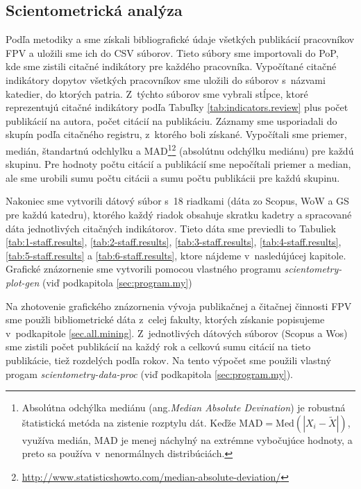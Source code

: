\subsection{Scientometrická analýza}

Podľa metodiky \citet{Kazakis2014a} a \citet{Kazakis2014b,Kazakis2015} sme
získali bibliografické údaje všetkých publikácií pracovníkov FPV a uložili sme
ich do CSV súborov. Tieto súbory sme importovali do PoP, kde sme zistili
citačné indikátory pre každého pracovníka. Vypočítané citačné indikátory
dopytov všetkých pracovníkov sme uložili do súborov s~názvami katedier, do
ktorých patria. Z~týchto súborov sme vybrali stĺpce, ktoré reprezentujú citačné
indikátory podľa Tabuľky \ref{tab:indicators.review} plus počet publikácií na
autora, počet citácií na publikáciu.  Záznamy sme usporiadali do skupín podľa
citačného registru, z~ktorého boli získané.  Vypočítali sme priemer, medián,
štandartnú odchlylku a MAD\footnote{Absolútna odchýlka mediánu
(ang.\emph{Median Absolute Devination}) je robustná štatistická metóda na
zistenie rozptylu dát. Keďže $\mathrm{MAD} = \mathrm{Med}(|X_i - \tilde{X}|)$,
využíva medián, MAD je menej náchylný na extrémne vybočujúce hodnoty, a preto
sa používa v~nenormálnych
distribúciách.}\footnote{\url{http://www.statisticshowto.com/median-absolute-deviation/}}
(absolútnu odchýlku mediánu) pre každú skupinu. Pre hodnoty počtu citácií a
publikácií sme nepočítali priemer a median, ale sme urobili sumu počtu citácii
a sumu počtu publikácii pre každú skupinu.

Nakoniec sme vytvorili dátový súbor s~18 riadkami (dáta zo Scopus, WoW a GS pre
každú katedru), ktorého každý riadok obsahuje skratku kadetry a spracované dáta
jednotlivých citačných indikátorov.  Tieto dáta sme previedli to Tabuliek
\ref{tab:1-staff.results}, \ref{tab:2-staff.results},
\ref{tab:3-staff.results}, \ref{tab:4-staff.results}, \ref{tab:5-staff.results}
a \ref{tab:6-staff.results}, ktore nájdeme v~nasledújúcej kapitole. Grafické
znázornenie sme vytvorili pomocou vlastného programu
\emph{scientometry-plot-gen} (viď podkapitola \ref{sec:program.my})

Na zhotovenie grafického znázornenia vývoja publikačnej a čitačnej činnosti FPV
sme použli bibliometrické dáta z~celej fakulty, ktorých získanie popisujeme
v~podkapitole \ref{sec.all.mining}. Z~jednotlivých dátových súborov (Scopus a
Wos) sme zistili počet publikácií na každý rok  a celkovú sumu citácií na tieto
publikácie, tiež rozdelých podľa rokov. Na tento výpočet sme použili vlastný
progam \emph{scientometry-data-proc} (viď podkapitola \ref{sec:program.my}).

